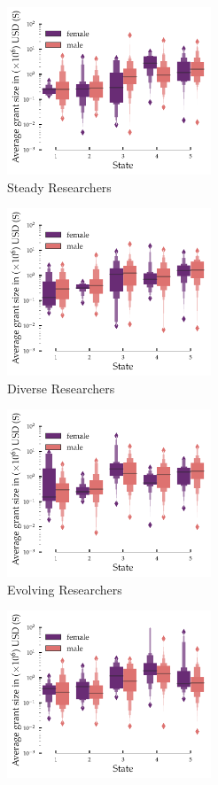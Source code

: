 \begin{figure}[tbh]
    \centering
    \begin{subfigure}{0.5\linewidth}
        \centering
        \includegraphics[width=0.8\linewidth,height=5cm]{figures/Cluster_4_PI_grant.pdf}
        \caption{Steady Researchers}
    \end{subfigure}%
    \begin{subfigure}{0.5\linewidth}
        \centering
        \includegraphics[width=0.8\linewidth,height=5cm]{figures/Cluster_3_PI_grant.pdf}
        \caption{Diverse Researchers}
    \end{subfigure}
    \begin{subfigure}{0.5\textwidth}
        \centering
        \includegraphics[width=0.8\linewidth,height=5cm]{figures/Cluster_1_PI_grant.pdf}
        \caption{Evolving Researchers}
    \end{subfigure}%
    \begin{subfigure}{0.5\textwidth}
        \centering
        \includegraphics[width=0.8\linewidth,height=5cm]{figures/Cluster_2_PI_grant.pdf}

\end{subfigure}
\end{figure}
